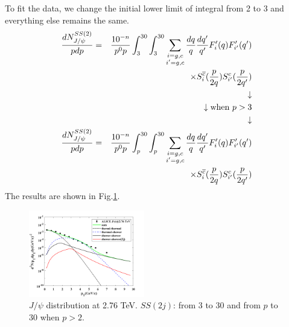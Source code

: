 \documentclass[twocolumn,aps,superscriptaddress,nofootinbib,floatfix]{revtex4}
\begin{document}
To fit the data, we change the initial lower limit of integral from 2 to 3 and everything else remains the same.
\begin{eqnarray}
	\frac{dN^{SS(2)}_{J/\psi}}{pdp}&=&\frac{10^{-n}}{p^0p}
	\int^{30}_{3}\int^{30}_{3}
	\sum_{\substack{i=g,c\\ i'=g,c}}  \frac{dq}{q}\frac{dq'}{q'}F'_i(q)F'_{i'}(q')\nonumber \\
	&&\times  S_i^{\overline c}({p\over 2q})   S_{i'}^c({p\over 2q'})\\
	&&\downarrow   \nonumber \\
	&&\downarrow   \text{when $p>3$}	 \nonumber \\
	&&\downarrow   \nonumber \\
	\frac{dN^{SS(2)}_{J/\psi}}{pdp}&=&\frac{10^{-n}}{p^0p}
	\int^{30}_{p}\int^{30}_{p}
	\sum_{\substack{i=g,c\\ i'=g,c}}  \frac{dq}{q}\frac{dq'}{q'}F'_i(q)F'_{i'}(q')\nonumber \\
	&&\times  S_i^{\overline c}({p\over 2q})   S_{i'}^c({p\over 2q'})
\end{eqnarray}
The results are shown in Fig.\ref{fig21}.
\begin{figure}[H]
	\includegraphics[width=0.45\textwidth]{p_3_30.png}
	\caption{$J/\psi$ distribution at 2.76 TeV. $SS(2j)$: from 3 to 30 and from $p$ to 30 when $p>2$.}
	\label{fig21}
\end{figure}
\end{document}
